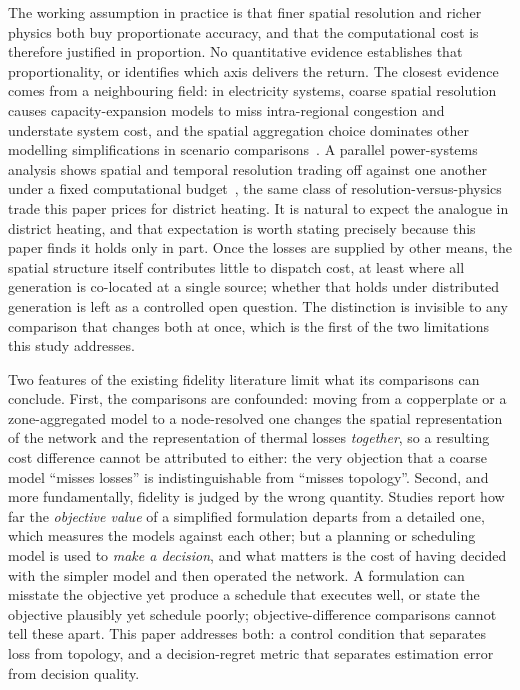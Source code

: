 \documentclass[a4paper,fleqn]{cas-sc}
\begin{document}
The working assumption in practice is that finer spatial resolution and richer physics
both buy proportionate accuracy, and that the computational cost is therefore justified in
proportion. No quantitative evidence establishes that proportionality, or identifies which
axis delivers the return. The closest evidence comes from a neighbouring field: in
electricity systems, coarse spatial resolution causes capacity-expansion models to miss
intra-regional congestion and understate system cost, and the spatial aggregation choice
dominates other modelling simplifications in scenario
comparisons~\cite{Frysztacki2021}. A parallel power-systems analysis shows spatial and
temporal resolution trading off against one another under a fixed computational
budget~\citep{FrewJacobson2016}, the same class of resolution-versus-physics trade this
paper prices for district heating. It is natural to expect the analogue in district
heating, and that expectation is worth stating precisely because this paper finds it
holds only in part. Once the losses are supplied by other means, the spatial structure itself
contributes little to dispatch cost, at least where all generation is co-located at a
single source; whether that holds under distributed generation is left as a
controlled open question. The distinction is
invisible to any comparison that changes both at once, which is the first of the two
limitations this study addresses.

Two features of the existing fidelity literature limit what its comparisons can
conclude. First, the comparisons are confounded: moving from a copperplate or a
zone-aggregated model to a node-resolved one changes the spatial representation of the
network and the representation of thermal losses \emph{together}, so a resulting cost
difference cannot be attributed to either: the very objection that a coarse model
``misses losses'' is indistinguishable from ``misses topology''. Second, and more
fundamentally, fidelity is judged by the wrong quantity. Studies report how far the
\emph{objective value} of a simplified formulation departs from a detailed one, which
measures the models against each other; but a planning or scheduling model is used to
\emph{make a decision}, and what matters is the cost of having decided with the simpler
model and then operated the network. A formulation can misstate the objective yet
produce a schedule that executes well, or state the objective plausibly yet schedule
poorly; objective-difference comparisons cannot tell these apart. This paper addresses
both: a control condition that separates loss from topology, and a decision-regret
metric that separates estimation error from decision quality.
\end{document}
